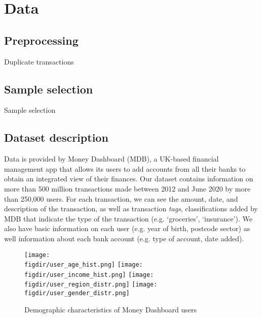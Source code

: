 
\section{Data}%
\label{sec:data}

\subsection{Preprocessing}%
\label{sub:preprocessing}

Duplicate transactions


\subsection{Sample selection}%
\label{sub:sample_selection}

\begin{table}[ht]
\caption{Sample selection}\label{tab:selection}

\end{table}


\subsection{Dataset description}
\label{sub:dataset_description}
Data is provided by Money Dashboard (MDB), a UK-based
financial management app that allows its users to add accounts from all
their banks to obtain an integrated view of their finances. Our
dataset contains information on more than 500 million transactions made between
2012 and June 2020 by more than 250,000 users. For each transaction, we can see
the amount, date, and description of the transaction, as well as transaction
\textit{tags}, classifications added by MDB that indicate the type of the
transaction (e.g.  `groceries', `insurance'). We also have basic information
 on each user (e.g. year of birth, postcode sector) as well information about
each bank account (e.g. type of account, date added).

\begin{figure}
    \caption{Demographic characteristics of Money Dashboard users}
    \label{fig:sumstats}
    \begin{center}
        \texttt{[image: \\figdir/user\_age\_hist.png]}
        \texttt{[image: \\figdir/user\_income\_hist.png]}
        \texttt{[image: \\figdir/user\_region\_distr.png]}
        \texttt{[image: \\figdir/user\_gender\_distr.png]}
    \end{center}
\end{figure}

